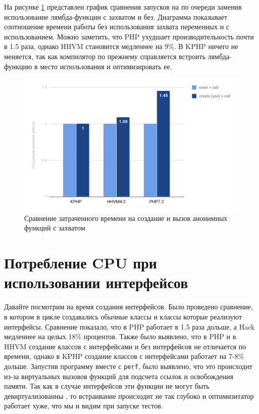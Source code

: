 На рисунке \ref{fig:benchmark-create_use_call-simple} представлен график сравнения запусков на по очереди заменив использование лямбда-функции с захватом и без.
Диаграмма показывает соотношение времени работы без использования захвата переменных и с использованием.
Можно заметить, что PHP ухудшает производительность почти в 1.5 раза, однако HHVM становится медленнее на 9\%.
В KPHP ничего не меняется, так как компилятор по прежнему справляется встроить лямбда-функцию в место использования и оптимизировать ее.
\begin{figure}[H]
    \caption{Сравнение затраченного времени на создание и вызов анонимных функций с захватом}
    \label{fig:benchmark-create_use_call-simple}
    \centering
    \includegraphics[width=\linewidth]{images/benchmark_create_use_call_simple}
\end{figure}

\section{Потребление CPU при использовании интерфейсов}
Давайте посмотрим на время создания интерфейсов.
Было проведено сравнение, в котором в цикле создавались обычные классы и классы которые реализуют интерфейсы.
Сравнение показало, что в PHP работает в 1.5 раза дольше, а Hack медленнее на целых 18\% процентов.
Также было выявлено, что в PHP и в HHVM создание классов с интерфейсами и без интерфейсов не отличается по времени,
однако в KPHP создание классов с интерфейсами работает на 7-8\% дольше.
Запустив программу вместе с \verb|perf|, было выявлено, что это происходит из-за виртуальных вызовов функций для подсчета ссылок и освобождения памяти.
Так как в случае интерфейсов эти функции не могут быть девиртуализованны \cite{devirtualization}, то встраивание происходит не так глубоко и оптимизитатор работает хуже, что мы и видим при запуске тестов.

